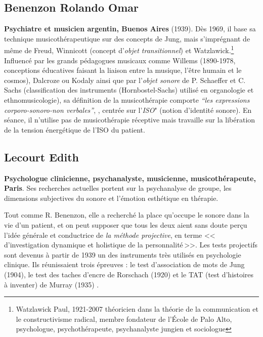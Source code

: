           \subsection{Benenzon Rolando Omar}
	\textbf{ Psychiatre et
    musicien argentin, Buenos Aires} (1939).
	  \label{benenzon}
	  Dès 1969, il base sa technique
	  musicothérapeutique sur des concepts
	  de Jung, mais s'imprégnant de même de Freud, Winnicott \autocite{winnicott}
          (concept d'\textit{objet transitionnel})
          et Watzlawick.\footnote{ Watzlawick Paul, 1921-2007  théoricien dans la théorie de la communication et le constructivisme radical, membre fondateur de l'École de Palo Alto, psychologue, psychothérapeute, psychanalyste jungien et sociologue}
	  Influencé par les grands  pédagogues musicaux comme
          Willems  (1890-1978, conceptions éducatives faisant la liaison
          entre la musique, l'être humain et le cosmos),
          Dalcroze ou Kodaly ainsi que par l'\textit{objet sonore} de
          P. Schaeffer
          et C. Sachs (classification des instruments
          (Hornbostel-Sachs) utilisé en organologie et ethnomusicologie), sa définition de la musicothérapie comporte
	  \emph{\textsl{ ``les expressions corporo-sonoro-non
              verbales''}}, \autocite{benenzon:musicotherapie},
	  centrée sur l'\textit{ISO}" (notion
          d'identité sonore). En séance, il n'utilise pas de
          musicothérapie réceptive mais travaille sur la libération de
          la tension énergétique de l'ISO du patient.

        \subsection{Lecourt Edith}
      \textbf{Psychologue clinicienne,
          psychanalyste, musicienne, musicothérapeute, Paris}. Ses recherches
        actuelles portent sur la psychanalyse de groupe, les
        dimensions subjectives du sonore  et l'émotion esthétique en
        thérapie.

   Tout comme R. Benenzon, elle a recherché  la place qu'occupe le sonore dans la vie d'un
        patient, et on peut supposer que tous les deux aient sans doute perçu l'idée générale et
        conductrice de \emph{la méthode projective},
        en terme
	    <<\,d'investigation dynamique et holistique de la
            personnalité\,>>.
            Les tests projectifs sont devenus à partir
        de 1939 un des instruments très utilisés en psychologie
        clinique. Ils réunissaient trois épreuves : le test
        d'association de mots de Jung (1904), le test des taches
        d'encre de Rorschach (1920) et le TAT (test d'histoires à
        inventer) de Murray (1935) \autocite[ch.~1, p.~13] {anzieu.chabert:methodes}.

